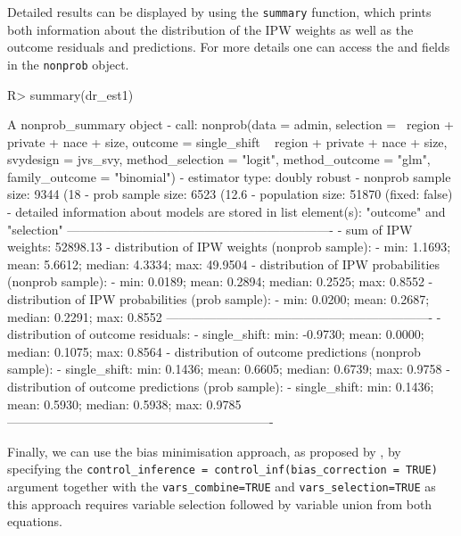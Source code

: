 \documentclass[
]{jss}
\begin{document}
Detailed results can be displayed by using the \texttt{summary}
function, which prints both information about the distribution of the
IPW weights as well as the outcome residuals and predictions. For more
details one can access the  and 
fields in the \texttt{nonprob} object.

\begin{CodeChunk}
\begin{CodeInput}
R> summary(dr_est1)
\end{CodeInput}
\begin{CodeOutput}
A nonprob_summary object
 - call: nonprob(data = admin, selection = ~region + private + nace + 
    size, outcome = single_shift ~ region + private + nace + 
    size, svydesign = jvs_svy, method_selection = "logit", method_outcome = "glm", 
    family_outcome = "binomial")
 - estimator type: doubly robust
 - nonprob sample size: 9344 (18%
 - prob sample size: 6523 (12.6%
 - population size: 51870 (fixed: false)
 - detailed information about models are stored in list element(s): "outcome" and "selection"
----------------------------------------------------------------
 - sum of IPW weights: 52898.13 
 - distribution of IPW weights (nonprob sample):
   - min: 1.1693; mean: 5.6612; median: 4.3334; max: 49.9504
 - distribution of IPW probabilities (nonprob sample):
   - min: 0.0189; mean: 0.2894; median: 0.2525; max: 0.8552
 - distribution of IPW probabilities (prob sample):
   - min: 0.0200; mean: 0.2687; median: 0.2291; max: 0.8552
----------------------------------------------------------------
 - distribution of outcome residuals:
   - single_shift: min: -0.9730; mean: 0.0000; median: 0.1075; max: 0.8564
 - distribution of outcome predictions (nonprob sample):
   - single_shift: min: 0.1436; mean: 0.6605; median: 0.6739; max: 0.9758
 - distribution of outcome predictions (prob sample):
   - single_shift: min: 0.1436; mean: 0.5930; median: 0.5938; max: 0.9785
----------------------------------------------------------------
\end{CodeOutput}
\end{CodeChunk}

Finally, we can use the bias minimisation approach, as proposed by
\citet{yang_doubly_2020}, by specifying the
\texttt{control\_inference\ =\ control\_inf(bias\_correction\ =\ TRUE)}
argument together with the \texttt{vars\_combine=TRUE} and
\texttt{vars\_selection=TRUE} as this approach requires variable
selection followed by variable union from both equations.
\end{document}
